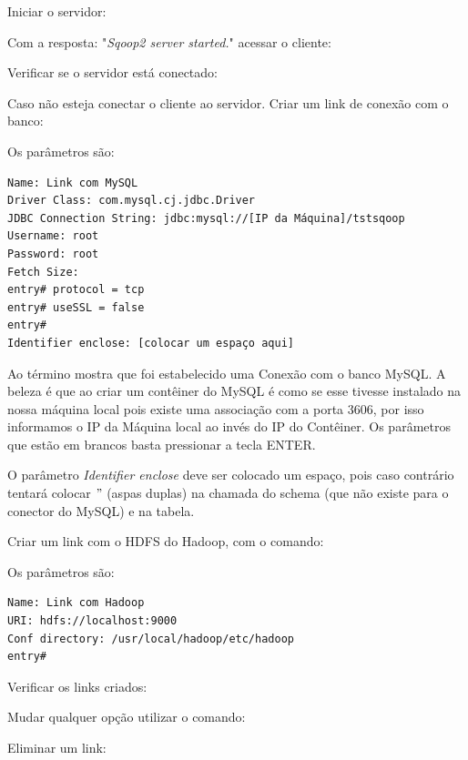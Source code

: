 \documentclass[a4paper,11pt]{article}
\begin{document}
Iniciar o servidor: \\

Com a resposta: "\textit{Sqoop2 server started.}" acessar o cliente: \\

Verificar se o servidor está conectado: \\

Caso não esteja conectar o cliente ao servidor. Criar um link de conexão com o banco: \\

Os parâmetros são:
\begin{lstlisting}[]
Name: Link com MySQL
Driver Class: com.mysql.cj.jdbc.Driver
JDBC Connection String: jdbc:mysql://[IP da Máquina]/tstsqoop
Username: root
Password: root
Fetch Size:
entry# protocol = tcp
entry# useSSL = false
entry# 
Identifier enclose: [colocar um espaço aqui]
\end{lstlisting}

Ao término mostra que foi estabelecido uma Conexão com o banco MySQL. A beleza é que ao criar um contêiner do MySQL é como se esse tivesse instalado na nossa máquina local pois existe uma associação com a porta 3606, por isso informamos o IP da Máquina local ao invés do IP do Contêiner. Os parâmetros que estão em brancos basta pressionar a tecla ENTER.

O parâmetro \textit{Identifier enclose} deve ser colocado um espaço, pois caso contrário tentará colocar $"$ (aspas duplas) na chamada do schema (que não existe para o conector do MySQL) e na tabela.

Criar um link com o HDFS do Hadoop, com o comando: \\

Os parâmetros são:
\begin{lstlisting}[]
Name: Link com Hadoop
URI: hdfs://localhost:9000
Conf directory: /usr/local/hadoop/etc/hadoop
entry#
\end{lstlisting}

Verificar os links criados: \\

Mudar qualquer opção utilizar o comando: \\

Eliminar um link:
\end{document}
